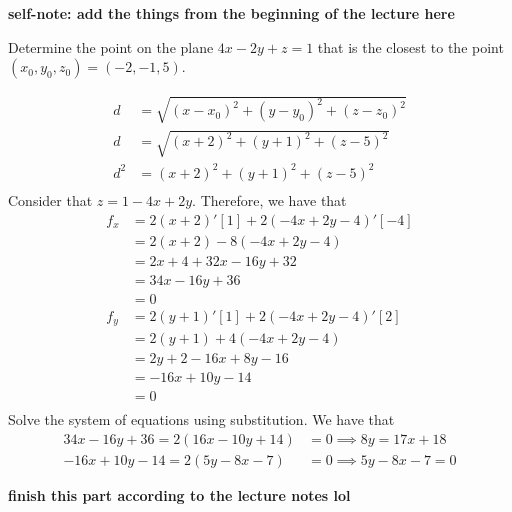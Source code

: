 \documentclass{article}
\begin{document}
\renewcommand{\familydefault}{\rmdefault}



\setcounter{page}{0}
\newpage
\tableofcontents
\newpage






\normalsize

\setcounter{page}{1}

\textbf{self-note: add the things from the beginning of the lecture here}

\newpage %

\begin{examplebox}
    Determine the point on the plane \( 4x - 2y + z = 1 \) that is the closest to the point \( (x_0, y_0, z_0) = (-2, -1, 5) \).

    \begin{solutionbox}
        \begin{align*}
            d &= \sqrt{(x - x_0)^2 + (y - y_0)^2 + (z - z_0)^2} \\
            d &= \sqrt{(x + 2)^2 + (y + 1)^2 + (z - 5)^2} \\
            d^2 &= (x + 2)^2 + (y + 1)^2 + (z - 5)^2 \\
        \end{align*}
        Consider that \( z = 1 - 4x + 2y \). Therefore, we have that
        \begin{align*}
            f_x &= 2(x + 2)'[1] + 2(-4x + 2y - 4)'[-4] \\
            &= 2(x + 2) - 8(-4x + 2y - 4) \\
            &= 2x + 4 + 32x - 16y + 32 \\
            &= 34x - 16y + 36 \\
            &= 0 \\
            f_y &= 2(y + 1)'[1] + 2(-4x + 2y - 4)'[2] \\
            &= 2(y + 1) + 4(-4x + 2y - 4) \\
            &= 2y + 2 - 16x + 8y - 16 \\
            &= -16x + 10y - 14 \\
            &= 0 \\
        \end{align*}
        Solve the system of equations using substitution. We have that
        \begin{align*}
            34x - 16y + 36 = 2(16x - 10y + 14) &= 0 \implies 8y = 17x + 18 \\
            -16x + 10y - 14 = 2(5y - 8x - 7) &= 0 \implies 5y - 8x - 7 = 0
        \end{align*}

        \textbf{finish this part according to the lecture notes lol}

    \end{solutionbox}
\end{examplebox}
\end{document}

